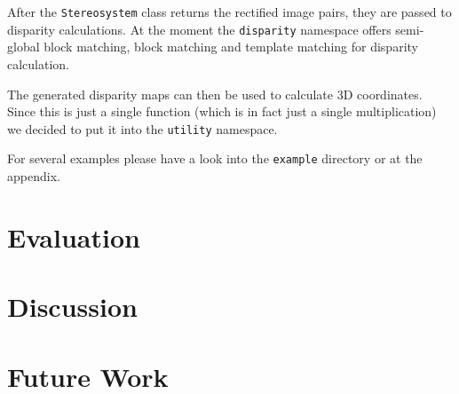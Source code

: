 \documentclass[11pt]{article}
\begin{document}
After the \texttt{Stereosystem} class returns the rectified image pairs, they are passed to disparity calculations. At the moment the \texttt{disparity} namespace offers semi-global block matching, block matching and template matching for disparity calculation.

The generated disparity maps can then be used to calculate 3D coordinates. Since this is just a single function (which is in fact just a single multiplication) we decided to put it into the \texttt{utility} namespace.

\bigskip
For several examples please have a look into the \texttt{example} directory or at the appendix. %


\section{Evaluation}
\section{Discussion}
\section{Future Work}

\nocite{*}


\end{document}
